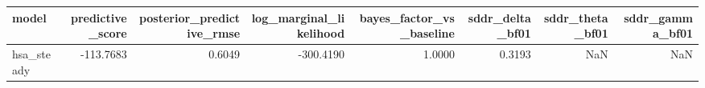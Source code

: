\begin{tabular}{lrrrrrrr}
\toprule
model & predictive\_score & posterior\_predictive\_rmse & log\_marginal\_likelihood & bayes\_factor\_vs\_baseline & sddr\_delta\_bf01 & sddr\_theta\_bf01 & sddr\_gamma\_bf01 \\
\midrule
hsa\_steady & -113.7683 & 0.6049 & -300.4190 & 1.0000 & 0.3193 & NaN & NaN \\
\bottomrule
\end{tabular}
